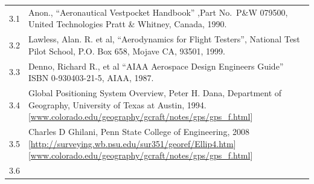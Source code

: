\documentclass[
]{book}
\begin{document}
\begin{longtable}[]{@{}ll@{}}
\toprule
\endhead
\begin{minipage}[t]{0.06\columnwidth}\raggedright
3.1\strut
\end{minipage} & \begin{minipage}[t]{0.88\columnwidth}\raggedright
Anon., ``Aeronautical Vestpocket Handbook'' ,Part No.~P\&W 079500, United Technologies Pratt \& Whitney, Canada, 1990.\strut
\end{minipage}\tabularnewline
\begin{minipage}[t]{0.06\columnwidth}\raggedright
3.2\strut
\end{minipage} & \begin{minipage}[t]{0.88\columnwidth}\raggedright
Lawless, Alan. R. et al, ``Aerodynamics for Flight Testers'', National Test Pilot School, P.O. Box 658, Mojave CA, 93501, 1999.\strut
\end{minipage}\tabularnewline
\begin{minipage}[t]{0.06\columnwidth}\raggedright
3.3\strut
\end{minipage} & \begin{minipage}[t]{0.88\columnwidth}\raggedright
Denno, Richard R., et al ``AIAA Aerospace Design Engineers Guide'' ISBN 0-930403-21-5, AIAA, 1987.\strut
\end{minipage}\tabularnewline
\begin{minipage}[t]{0.06\columnwidth}\raggedright
3.4\strut
\end{minipage} & \begin{minipage}[t]{0.88\columnwidth}\raggedright
Global Positioning System Overview, Peter H. Dana, Department of Geography, University of Texas at Austin, 1994. {[}\url{www.colorado.edu/geography/gcraft/notes/gps/gps_f.html}{]}\strut
\end{minipage}\tabularnewline
\begin{minipage}[t]{0.06\columnwidth}\raggedright
3.5\strut
\end{minipage} & \begin{minipage}[t]{0.88\columnwidth}\raggedright
Charles D Ghilani, Penn State College of Engineering, 2008 {[}\url{http://surveying.wb.psu.edu/sur351/georef/Ellip4.htm}{]} {[}\url{www.colorado.edu/geography/gcraft/notes/gps/gps_f.html}{]}\strut
\end{minipage}\tabularnewline
\begin{minipage}[t]{0.06\columnwidth}\raggedright
3.6\strut
\end{minipage} & \begin{minipage}[t]{0.88\columnwidth}\raggedright

\end{minipage}
\end{longtable}
\end{document}
